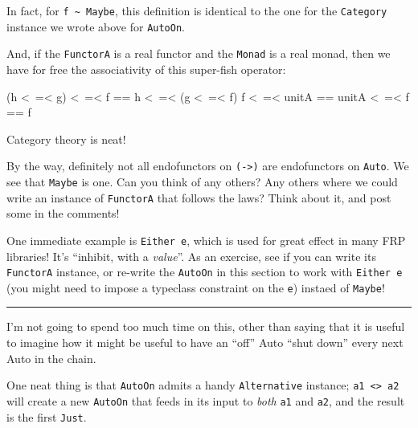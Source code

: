 \documentclass[]{article}
\newenvironment{Shaded}{}{}
\newcommand{\FunctionTok}[1]{\textcolor[rgb]{0.02,0.16,0.49}{{#1}}}
\newcommand{\NormalTok}[1]{{#1}}
\begin{document}
In fact, for \texttt{f\ \textasciitilde{}\ Maybe}, this definition is
identical to the one for the \texttt{Category} instance we wrote above
for \texttt{AutoOn}.

And, if the \texttt{FunctorA} is a real functor and the \texttt{Monad}
is a real monad, then we have for free the associativity of this
super-fish operator:

\begin{Shaded}
\begin{Highlighting}[]
\NormalTok{(h }\FunctionTok{<~=<} \NormalTok{g) }\FunctionTok{<~=<} \NormalTok{f }\FunctionTok{==} \NormalTok{h }\FunctionTok{<~=<} \NormalTok{(g }\FunctionTok{<~=<} \NormalTok{f)}
\NormalTok{f }\FunctionTok{<~=<} \NormalTok{unitA      }\FunctionTok{==} \NormalTok{unitA }\FunctionTok{<~=<} \NormalTok{f      }\FunctionTok{==} \NormalTok{f}
\end{Highlighting}
\end{Shaded}

Category theory is neat!

By the way, definitely not all endofunctors on
\texttt{(-\textgreater{})} are endofunctors on \texttt{Auto}. We see
that \texttt{Maybe} is one. Can you think of any others? Any others
where we could write an instance of \texttt{FunctorA} that follows the
laws? Think about it, and post some in the comments!

One immediate example is \texttt{Either\ e}, which is used for great
effect in many FRP libraries! It's ``inhibit, with a \emph{value}''. As
an exercise, see if you can write its \texttt{FunctorA} instance, or
re-write the \texttt{AutoOn} in this section to work with
\texttt{Either\ e} (you might need to impose a typeclass constraint on
the \texttt{e}) instaed of \texttt{Maybe}!

\begin{center}\rule{0.5\linewidth}{\linethickness}\end{center}

I'm not going to spend too much time on this, other than saying that it
is useful to imagine how it might be useful to have an ``off'' Auto
``shut down'' every next Auto in the chain.

One neat thing is that \texttt{AutoOn} admits a handy
\texttt{Alternative} instance;
\texttt{a1\ \textless{}\textbar{}\textgreater{}\ a2} will create a new
\texttt{AutoOn} that feeds in its input to \emph{both} \texttt{a1} and
\texttt{a2}, and the result is the first \texttt{Just}.
\end{document}
